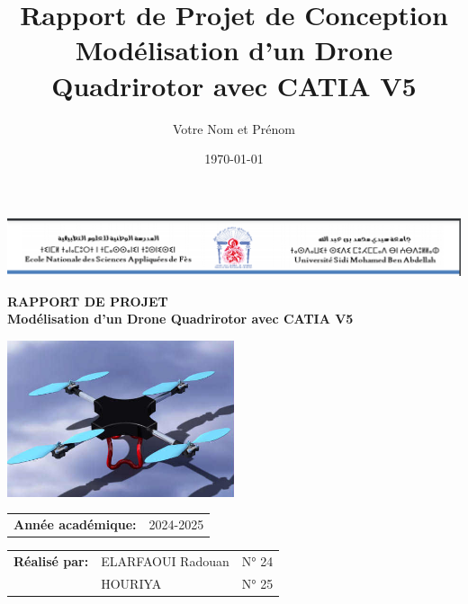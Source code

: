 \documentclass[a4paper,12pt]{report}
\title{\Huge{\textbf{\color{bleuPrimaire}Rapport de Projet de Conception}}\\\Large{\color{bleuSecondaire}Modélisation d'un Drone Quadrirotor avec CATIA V5}}
\author{Votre Nom et Prénom}
\date{\today}
\begin{document}
\begin{titlepage}
    \begin{center}
        \includegraphics[width=\textwidth]{images/ensa_header.png}
        
        \vspace{2cm}
        
        {\color{bleuPrimaire}\textbf{\Huge{RAPPORT DE PROJET}}}\\
        \vspace{1cm}
        {\color{bleuPrimaire}\textbf{\huge{Modélisation d'un Drone Quadrirotor avec CATIA V5}}}
        
        \vspace{1.5cm}
        
        \begin{center}
        \includegraphics[width=0.5\textwidth]{images/drone_apercu.png}
        \end{center}
        
        \vspace{1.5cm}
        
        \begin{tabular}{l l}
            \textbf{Année académique:} & 2024-2025 \\
        \end{tabular}
        
        \vfill
        
        \begin{tabular}{l l l}
            \textbf{Réalisé par:} & ELARFAOUI Radouan & N° 24 \\
            & HOURIYA & N° 25 \\
        \end{tabular}
        

\end{center}
\end{titlepage}
\end{document}
